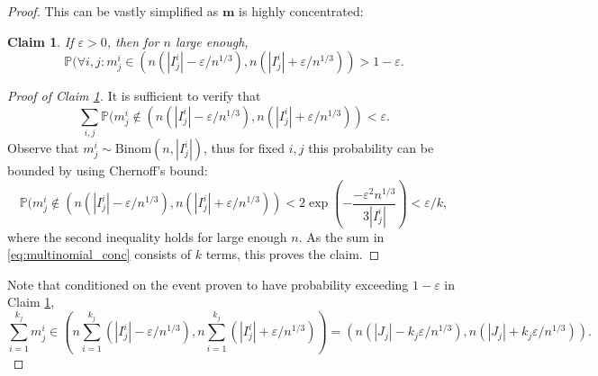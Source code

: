 \documentclass[11pt]{article}
\newtheorem{claim}[theorem]{Claim}
\theoremstyle{definition}
\begin{document}
\begin{proof}
    This can be vastly simplified as $\mathbf{m}$ is highly concentrated:

    \begin{claim}\label{claim:multinomial_concentration}
        If $\varepsilon>0$, then for $n$ large enough,
        $$\mathbb{P}(\forall i,j: m_j^i \in (n (|I_j^i|-\varepsilon/n^{1/3}), n (|I_j^i|+\varepsilon/n^{1/3}))>1-\varepsilon.$$
    \end{claim}

    \begin{proof}[Proof of Claim \ref{claim:multinomial_concentration}]
        It is sufficient to verify that
        \begin{equation} \label{eq:multinomial_conc}
        \sum_{i, j} \mathbb{P}(m_j^i \notin (n (|I_j^i|-\varepsilon/n^{1/3}), n (|I_j^i|+\varepsilon/n^{1/3}))<\varepsilon.
        \end{equation}
        Observe that $m_j^i\sim \mathrm{Binom}(n, |I_j^i|)$, thus for fixed $i, j$ this probability can be bounded by using Chernoff's bound:
        $$\mathbb{P}(m_j^i \notin (n (|I_j^i|-\varepsilon/n^{1/3}), n (|I_j^i|+\varepsilon/n^{1/3}))< 2 \exp\left(-\frac{-\varepsilon^2n^{1/3}}{3|I_j^i|}\right)<\varepsilon/k,$$
        where the second inequality holds for large enough $n$. As the sum in \eqref{eq:multinomial_conc} consists of $k$ terms, this proves the claim.
    \end{proof}

    Note that conditioned on the event proven to have probability exceeding $1-\varepsilon$ in Claim \ref{claim:multinomial_concentration}, 
    $$\sum_{i=1}^{k_j}m_j^i \in \left(n \sum_{i=1}^{k_j}(|I_j^i|-\varepsilon/n^{1/3}), n \sum_{i=1}^{k_j}(|I_j^i|+\varepsilon/n^{1/3})\right)=(n(|J_j|-k_j\varepsilon/n^{1/3}), n(|J_j|+k_j\varepsilon/n^{1/3})).$$
    

\end{proof}
\end{document}
